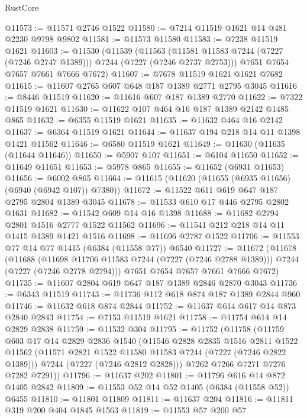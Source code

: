 \begin{lexlean}{RustCore}
\begin{coremodule}
@11573 := @11571 @2746 @1522
@11580 := @7214 @11519 @1621 @14 @481 @2230 @9798 @9802
@11581 := @11573 @11580
@11583 := @7238 @11519 @1621
@11603 := @11530
    (@11539
      (@11563 (@11581 @11583 @7244 (@7227 (@7246 @2747 @1389))) @7244 (@7227 (@7246 @2737 @2753)))
      @7651
      @7654
      @7657
      @7661
      @7666
      @7672)
@11607 := @7678 @11519 @1621 @1621 @7682
@11615 := @11607 @2765 @607 @648 @187 @1389 @2771 @2795 @3045
@11616 := @8446 @11519
@11620 := @11616 @607 @187 @1389 @2770
@11622 := @7322 @11519 @1621
@11630 := @11622 @107 @464 @16 @187 @1389 @2142 @1485 @865
@11632 := @6355 @11519 @1621
@11635 := @11632 @464 @16 @2142
@11637 := @6364 @11519 @1621
@11644 := @11637 @194 @218 @14 @11 @1398 @1421 @11562
@11646 := @6580 @11519 @1621
@11649 := @11630 (@11635 (@11644 @11646))
@11650 := @5907 @107
@11651 := @6104 @11650
@11652 := @11649 @11651
@11653 := @5978 @865
@11655 := @11652 (@6931 @11653)
@11656 := @6002 @865
@11664 := @11615 (@11620 (@11655 (@6935 @11656) (@6940 (@6942 @107)) @7380))
@11672 := @11522 @611 @619 @647 @187 @2795 @2804 @1389 @3045
@11678 := @11533 @610 @17 @446 @2795 @2802 @1631
@11682 := @11542 @609 @14 @16 @1398
@11688 := @11682 @2794 @2801 @1516 @2777 @1522 @11562
@11696 := @11541 @212 @218 @14 @11 @1415 @1389 @1421 @1516
@11698 := @11696 @2787 @1522
@11706 := @11553 @77 @14 @77 @1415 (@6384 (@11558 @77)) @6540
@11727 := @11672
    (@11678
      (@11688
        (@11698 @11706 @11583 @7244 (@7227 (@7246 @2788 @1389)))
        @7244
        (@7227 (@7246 @2778 @2794)))
      @7651
      @7654
      @7657
      @7661
      @7666
      @7672)
@11735 := @11607 @2804 @619 @647 @187 @1389 @2846 @2870 @3043
@11736 := @6343 @11519
@11743 := @11736 @112 @618 @874 @187 @1389 @2844 @960
@11746 := @11632 @618 @874 @2844
@11752 := @11637 @614 @617 @14 @873 @2840 @2843
@11754 := @7153 @11519 @1621
@11758 := @11754 @614 @14 @2829 @2838
@11759 := @11532 @304
@11795 := @11752
    (@11758
      (@11759
        @603
        @17
        @14
        @2829
        @2836
        @1540
        (@11546
          @2828
          @2835
          @1516
          @2811
          @1522
          @11562
          (@11571 @2821 @1522 @11580 @11583 @7244 (@7227 (@7246 @2822 @1389)))
          @7244
          (@7227 (@7246 @2812 @2828)))
        @7262
        @7266
        @7271
        @7276
        @7282
        @7291))
@11796 := @11637 @202
@11801 := @11796 @616 @14 @872 @1405 @2842
@11809 := @11553 @52 @14 @52 @1405 (@6384 (@11558 @52)) @6455
@11810 := @11801 @11809
@11811 := @11637 @204
@11816 := @11811 @319 @200 @404 @1845 @1563
@11819 := @11553 @57 @200 @57

\end{coremodule}
\end{lexlean}
